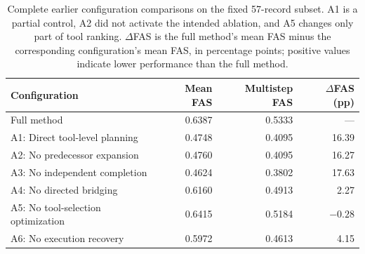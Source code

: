 \begin{table}[t]
  \caption{Complete earlier configuration comparisons on the fixed 57-record subset. A1 is a partial control, A2 did not activate the intended ablation, and A5 changes only part of tool ranking. $\Delta$FAS is the full method's mean FAS minus the corresponding configuration's mean FAS, in percentage points; positive values indicate lower performance than the full method.}
  \label{tab:ablation-full}
  \centering
  \begin{tabularx}{\textwidth}{@{}Xrrr@{}}
    \toprule
    Configuration & Mean FAS & Multistep FAS & $\Delta$FAS (pp) \\
    \midrule
    Full method & 0.6387 & 0.5333 & --- \\
    A1: Direct tool-level planning & 0.4748 & 0.4095 & 16.39 \\
    A2: No predecessor expansion & 0.4760 & 0.4095 & 16.27 \\
    A3: No independent completion & 0.4624 & 0.3802 & 17.63 \\
    A4: No directed bridging & 0.6160 & 0.4913 & 2.27 \\
    A5: No tool-selection optimization & 0.6415 & 0.5184 & $-0.28$ \\
    A6: No execution recovery & 0.5972 & 0.4613 & 4.15 \\
    \bottomrule
  \end{tabularx}
\end{table}
